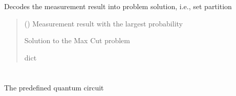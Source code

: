 \documentclass[letterpaper,10pt,english]{sphinxmanual}
\begin{document}
\begin{fulllineitems}
\begin{fulllineitems}
\begin{quote}
\begin{description}
\end{description}\end{quote}

\end{fulllineitems}


\begin{fulllineitems}
\label{\detokenize{qcompute_qapp.application.optimization:qcompute_qapp.application.optimization.MaxCut.decode_bitstring}}
\pysigstartsignatures
{}
\pysigstopsignatures
\sphinxAtStartPar
Decodes the measurement result into problem solution, i.e., set partition
\begin{quote}\begin{description}
\sphinxAtStartPar
{} () \textendash{} Measurement result with the largest probability

\sphinxAtStartPar
Solution to the Max Cut problem

\sphinxAtStartPar
dict

\end{description}\end{quote}

\end{fulllineitems}


\end{fulllineitems}


\sphinxstepscope


\section{}
\label{\detokenize{qcompute_qapp.circuit:module-qcompute_qapp.circuit}}\label{\detokenize{qcompute_qapp.circuit:qcompute-qapp-circuit}}\label{\detokenize{qcompute_qapp.circuit::doc}}
\sphinxAtStartPar
The pre\sphinxhyphen{}defined quantum circuit
\end{document}
